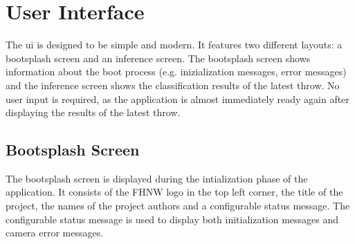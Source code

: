 \section{User Interface}
\label{sec:inference:user_interface}

The \acrfull{ui} is designed to be simple and modern.
It features two different layouts: a bootsplash screen and an inference screen.
The bootsplash screen shows information about the boot process (e.g. inizialization messages, error messages) and the inference screen shows the classification results of the latest throw.
No user input is required, as the application is almost immediately ready again after displaying the results of the latest throw.

\subsection{Bootsplash Screen}
\label{subsec:inference:user_interface:bootsplash_screen}

The bootsplash screen is displayed during the intialization phase of the application.
It consists of the FHNW logo in the top left corner, the title of the project, the names of the project authors and a configurable status message.
The configurable status message is used to display both initialization messages and camera error messages.

